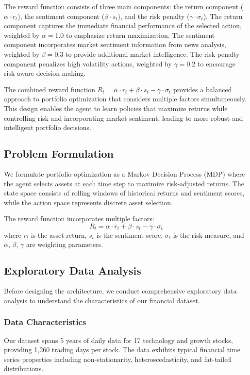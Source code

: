 \documentclass[12pt,a4paper]{article}
\begin{document}
The reward function consists of three main components: the return component ($\alpha \cdot r_t$), the sentiment component ($\beta \cdot s_t$), and the risk penalty ($\gamma \cdot \sigma_t$). The return component captures the immediate financial performance of the selected action, weighted by $\alpha=1.0$ to emphasize return maximization. The sentiment component incorporates market sentiment information from news analysis, weighted by $\beta=0.3$ to provide additional market intelligence. The risk penalty component penalizes high volatility actions, weighted by $\gamma=0.2$ to encourage risk-aware decision-making.

The combined reward function $R_t = \alpha \cdot r_t + \beta \cdot s_t - \gamma \cdot \sigma_t$ provides a balanced approach to portfolio optimization that considers multiple factors simultaneously. This design enables the agent to learn policies that maximize returns while controlling risk and incorporating market sentiment, leading to more robust and intelligent portfolio decisions.

\subsection{Problem Formulation}

We formulate portfolio optimization as a Markov Decision Process (MDP) where the agent selects assets at each time step to maximize risk-adjusted returns. The state space consists of rolling windows of historical returns and sentiment scores, while the action space represents discrete asset selection.

The reward function incorporates multiple factors:
\begin{equation}
R_t = \alpha \cdot r_t + \beta \cdot s_t - \gamma \cdot \sigma_t
\end{equation}
where $r_t$ is the asset return, $s_t$ is the sentiment score, $\sigma_t$ is the risk measure, and $\alpha$, $\beta$, $\gamma$ are weighting parameters.

\subsection{Exploratory Data Analysis}

Before designing the architecture, we conduct comprehensive exploratory data analysis to understand the characteristics of our financial dataset.

\subsubsection{Data Characteristics}
Our dataset spans 5 years of daily data for 17 technology and growth stocks, providing 1,260 trading days per stock. The data exhibits typical financial time series properties including non-stationarity, heteroscedasticity, and fat-tailed distributions.
\end{document}
